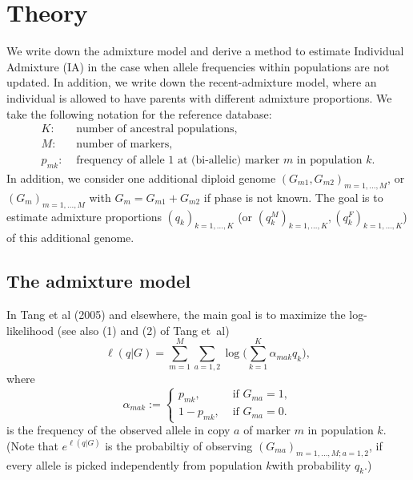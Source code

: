 \documentclass[12pt]{article}
\theoremstyle{definition}
\begin{document}
\renewcommand{\theequation}{S\arabic{equation}}
\renewcommand{\thefigure}{S\arabic{figure}}
\renewcommand{\thetable}{S\arabic{table}}
\renewcommand{\thesection}{S\arabic{section}}


\section{Theory}
We write down the admixture model and derive a method to estimate
Individual Admixture (IA) in the case when allele frequencies within
populations are not updated. In addition, we write down the
recent-admixture model, where an individual is allowed to have parents
with different admixture proportions. We take the following notation
for the reference database:
\begin{align*}
  K: & \text{ number of ancestral populations,}
  \\ M: & \text{ number of markers,}
  \\ p_{mk}: & \text{ frequency of allele 1 at (bi-allelic) marker $m$ in population $k$.}
\end{align*}
In addition, we consider one additional diploid genome
$(G_{m1}, G_{m2})_{m=1,...,M}$, or $(G_m)_{m=1,...,M}$ with
$G_m = G_{m1} + G_{m2}$ if phase is not known. The goal is to estimate
admixture proportions $(q_k)_{k=1,...,K}$ (or
$(q^M_{k})_{k=1,...,K}, (q^F_{k})_{k=1,...,K}$) of this additional
genome.

\subsection{The admixture model}
In Tang et al (2005) and elsewhere, the main goal is to maximize the
log-likelihood (see also (1) and (2) of Tang et~al)
$$ \ell(q|G) = \sum_{m=1}^M \sum_{a=1,2} \log\Big(\sum_{k=1}^K \alpha_{mak}q_k\Big),$$
where
$$\alpha_{mak} := \begin{cases} p_{mk}, & \text{ if }G_{ma}=1,\\ 1-p_{mk}, & \text{ if }G_{ma}=0.\end{cases}$$
is the frequency of the observed allele in copy $a$ of marker $m$ in
population $k$. (Note that $e^{\ell(q|G)}$ is the probabiltiy of
observing $(G_{ma})_{m=1,...,M; a=1,2}$, if every allele is picked
independently from population $k$with probability $q_k$.)
\end{document}
